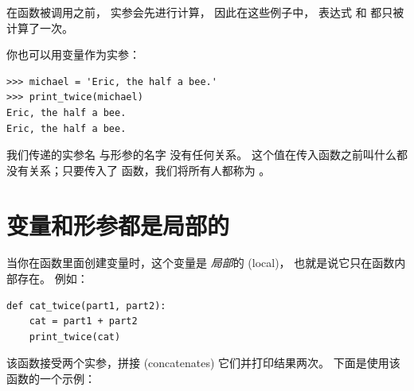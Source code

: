 在函数被调用之前， 实参会先进行计算， 因此在这些例子中， 
表达式  和  都只被计算了一次。



你也可以用变量作为实参：

\begin{lstlisting}
>>> michael = 'Eric, the half a bee.'
>>> print_twice(michael)
Eric, the half a bee.
Eric, the half a bee.
\end{lstlisting}

%

我们传递的实参名  与形参的名字  没有任何关系。 这个值在传入函数之前叫什么都没有关系；只要传入了  函数，我们将所有人都称为 。


%
\section{变量和形参都是局部的}
  
  


当你在函数里面创建变量时，这个变量是 {\em 局部}的 (local)，
也就是说它只在函数内部存在。 例如：

\begin{lstlisting}
def cat_twice(part1, part2):
    cat = part1 + part2
    print_twice(cat)
\end{lstlisting}

%

该函数接受两个实参，拼接 (concatenates) 它们并打印结果两次。 下面是使用该函数的一个示例：

